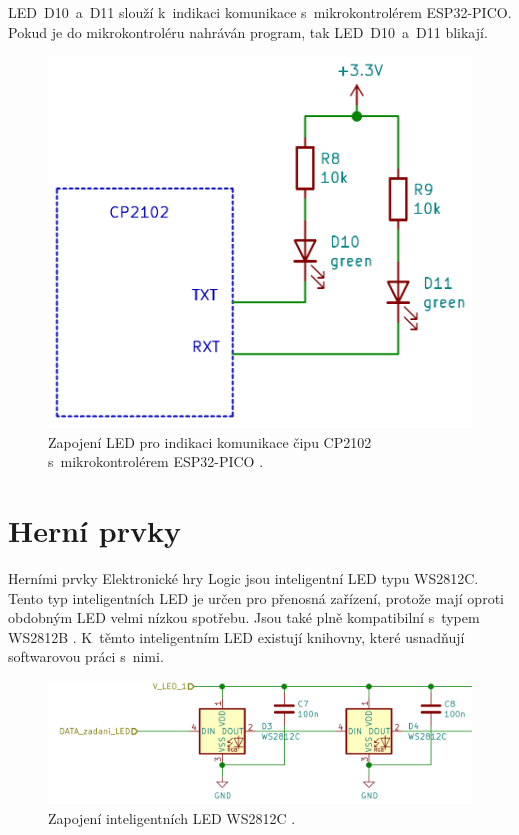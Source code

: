   LED~D10~a~D11 slouží k~indikaci komunikace s~mikrokontrolérem ESP32-PICO. Pokud je do mikrokontroléru nahráván program, tak LED~D10~a~D11 
  blikají.

  \begin{figure}[!h]
      \begin{center}
        \includegraphics[scale=0.35]{obrazky/CP2102_LED.png}
      \end{center}
      \caption[Zapojení LED pro indikaci komunikace čipu CP2102 s~mikrokontrolérem ESP32-PICO \cite{CP2102_datasheet}]{Zapojení LED pro indikaci 
      komunikace čipu CP2102 s~mikrokontrolérem ESP32-PICO \cite{CP2102_datasheet}.}
  \end{figure}

  \section{Herní prvky}
  Herními prvky Elektronické hry Logic jsou inteligentní LED typu WS2812C. Tento typ inteligentních LED je určen pro přenosná 
  zařízení, protože mají oproti obdobným LED velmi nízkou spotřebu. Jsou také plně kompatibilní s~typem WS2812B \cite{WS2812C_datasheet}. K~těmto 
  inteligentním LED existují knihovny, které usnadňují softwarovou práci s~nimi.

  \begin{figure}[!h]
    \begin{center}
      \includegraphics[scale=0.5]{obrazky/2_LED_WS2812C.png}
    \end{center}
    \caption[Zapojení inteligentních LED WS2812C \cite{WS2812C_datasheet}]{Zapojení inteligentních LED WS2812C \cite{WS2812C_datasheet}.}
  \end{figure}

